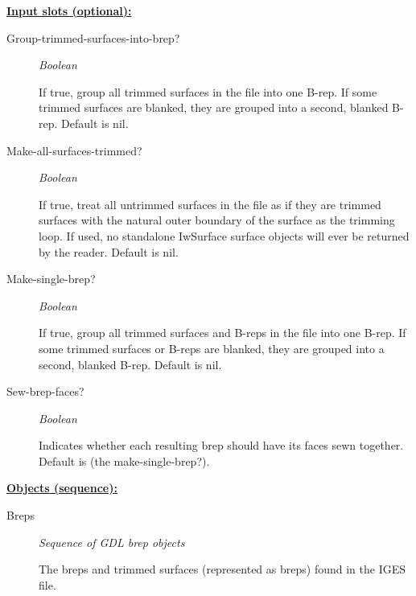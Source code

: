 \documentclass [11pt]{book}
\begin{document}
\begin{itemize}
\textbf{
\underline{Input slots (optional):}}

\begin{description}

\item [Group-trimmed-surfaces-into-brep?]
\emph{Boolean}

 If true, group all trimmed surfaces in the file into one B-rep.
If some trimmed surfaces are blanked, they are grouped into a second, blanked B-rep. Default is nil.




\item [Make-all-surfaces-trimmed?]
\emph{Boolean}

 If true, treat all untrimmed surfaces in the file as if they are trimmed surfaces with
the natural outer boundary of the surface as the trimming loop.  If used, no standalone IwSurface surface objects
will ever be returned by the reader.  Default is nil.




\item [Make-single-brep?]
\emph{Boolean}

 If true, group all trimmed surfaces and B-reps in the file into one B-rep.
If some trimmed surfaces or B-reps are blanked, they are grouped into a second, blanked B-rep. Default is nil.




\item [Sew-brep-faces?]
\emph{Boolean}

 Indicates whether each resulting brep should have its faces sewn together. Default is (the make-single-brep?).




\end{description}






\textbf{
\underline{Objects (sequence):}}

\begin{description}

\item [Breps]
\emph{Sequence of GDL brep objects}

 The breps and trimmed surfaces (represented as breps) found in the IGES file.





\end{description}
\end{itemize}
\end{document}
